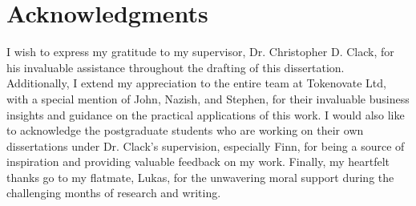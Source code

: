 \section*{Acknowledgments}
I wish to express my gratitude to my supervisor, Dr. Christopher D. Clack, for his invaluable assistance throughout the drafting of this dissertation. Additionally, I extend my appreciation to the entire team at Tokenovate Ltd, with a special mention of John, Nazish, and Stephen, for their invaluable business insights and guidance on the practical applications of this work. I would also like to acknowledge the postgraduate students who are working on their own dissertations under Dr. Clack's supervision, especially Finn, for being a source of inspiration and providing valuable feedback on my work. Finally, my heartfelt thanks go to my flatmate, Lukas, for the unwavering moral support during the challenging months of research and writing.
